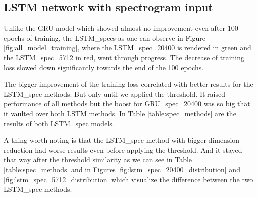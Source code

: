 \subsection{LSTM network with spectrogram input}\label{ssec:LSTM_spec_results}

Unlike the GRU model which showed almost no improvement even after 100 epochs of training, the LSTM\_specs as one can observe in Figure \ref{fig:all_model_training}, where the LSTM\_spec\_20400 is rendered in green and the LSTM\_spec\_5712 in red, went through progress. The decrease of training loss slowed down significantly towards the end of the 100 epochs.

The bigger improvement of the training loss correlated with better results for the LSTM\_spec methods. But only until we applied the threshold. It raised performance of all methods but the boost for GRU\_spec\_20400 was so big that it vaulted over both LSTM methods. In Table \ref{table:spec_methods} are the results of both LSTM\_spec models. 

A thing worth noting is that the LSTM\_spec method with bigger dimension reduction had worse results even before applying the threshold. And it stayed that way after the threshold similarity as we can see in Table \ref{table:spec_methods} and in Figures \ref{fig:lstm_spec_20400_distribution} and \ref{fig:lstm_spec_5712_distribution} which visualize the difference between the two LSTM\_spec methods.

